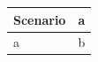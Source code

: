 \begin{tabular}{ll}
  \toprule
  {Scenario}       & a \\
  \midrule
  a & b  \\
  \bottomrule
\end{tabular}
